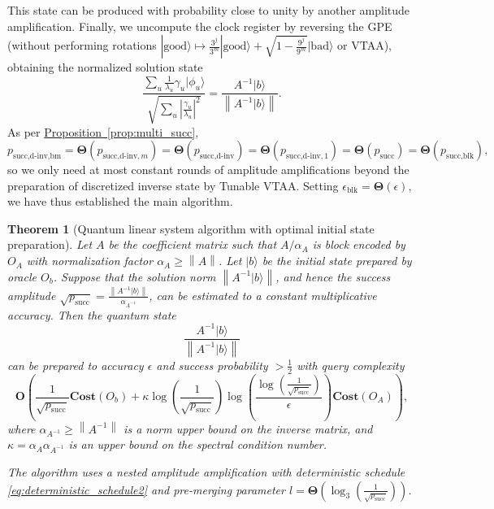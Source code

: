 \documentclass[letterpaper,onecolumn,11pt,accepted=2026-02-14]{quantumarticle}
\newcommand{\abs}[1]{\left\lvert#1\right\rvert}
\newcommand{\norm}[1]{\left\lVert#1\right\rVert}
\newtheorem{theorem}{Theorem}
\theoremstyle{remark}
\theoremstyle{plain}
\newcommand{\eq}[1]{\cref{eq:#1}}
\newcommand{\prop}[1]{\hyperref[prop:#1]{Proposition~\ref*{prop:#1}}}
\newcommand{\ket}[1]{|#1\rangle}
\begin{document}
This state can be produced with probability close to unity by another amplitude amplification.
Finally, we uncompute the clock register by reversing the GPE (without performing rotations $\ket{\mathrm{good}}\mapsto\frac{3^j}{3^m}\ket{\mathrm{good}}+\sqrt{1-\frac{9^j}{9^m}}\ket{\mathrm{bad}}$ or VTAA), obtaining the normalized solution state
\begin{equation}
    \frac{\sum_{u}\frac{1}{\lambda_u}\gamma_u\ket{\phi_u}}{\sqrt{\sum_{u}\abs{\frac{\gamma_u}{\lambda_u}}^2}}
    =\frac{A^{-1}\ket{b}}{\norm{A^{-1}\ket{b}}}.
\end{equation}
As per \prop{multi_succ},
\begin{equation*}
    p_{\text{succ,d-inv,bm}}=\mathbf{\Theta}\left(p_{\text{succ,d-inv},m}\right)=\mathbf{\Theta}\left(p_{\text{succ,d-inv}}\right)=\mathbf{\Theta}(p_{\text{succ,d-inv},1})=\mathbf{\Theta}\left(p_{\text{succ}}\right)=\mathbf{\Theta}\left(p_{\text{succ,blk}}\right),
\end{equation*}
so we only need at most constant rounds of amplitude amplifications beyond the preparation of discretized inverse state by Tunable VTAA. Setting $\epsilon_{\text{blk}}=\mathbf{\Theta}(\epsilon)$, we have thus established the main algorithm.

\begin{theorem}[Quantum linear system algorithm with optimal initial state preparation]
\label{thm:qls_opt_init}
Let $A$ be the coefficient matrix such that $A/\alpha_A$ is block encoded by $O_A$ with normalization factor $\alpha_A\geq\norm{A}$. Let $\ket{b}$ be the initial state prepared by oracle $O_b$.
Suppose that the solution norm $\norm{A^{-1}\ket{b}}$, and hence the success amplitude $\sqrt{p_{\text{succ}}}=\frac{\norm{A^{-1}\ket{b}}}{\alpha_{A^{-1}}}$, can be estimated to a constant multiplicative accuracy.
Then the quantum state 
\begin{equation}
    \frac{A^{-1}\ket{b}}{\norm{A^{-1}\ket{b}}}
\end{equation}
can be prepared to accuracy $\epsilon$ and success probability $>\frac{1}{2}$ with query complexity
\begin{equation}
    \mathbf{O}\left(\frac{1}{\sqrt{p_{\text{succ}}}}\mathbf{Cost}\left(O_b\right)
    +\kappa
    \log\left(\frac{1}{\sqrt{p_{\text{succ}}}}\right)
    \log\left(\frac{\log\left(\frac{1}{\sqrt{p_{\text{succ}}}}\right)}{\epsilon}\right)
    \mathbf{Cost}\left(O_A\right)\right),
\end{equation}
where $\alpha_{A^{-1}}\geq\norm{A^{-1}}$ is a norm upper bound on the inverse matrix, and
$\kappa=\alpha_A\alpha_{A^{-1}}$ is an upper bound on the spectral condition number.

The algorithm uses a nested amplitude amplification with deterministic schedule \eq{deterministic_schedule2} and pre-merging parameter $l=\mathbf{\Theta}\left(\log_3\left(\frac{1}{\sqrt{p_{\text{succ}}}}\right)\right)$.
\end{theorem}
\end{document}
